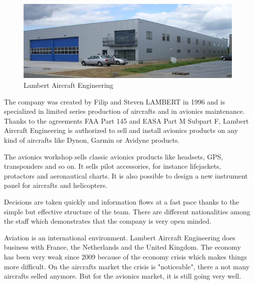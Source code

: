 \documentclass[11pt,a4paper]{article}
\begin{document}
\begin{figure}[ht!]
	\begin{center}
		\includegraphics[width=15cm]{pics/PIC001.jpg}
		\caption{Lambert Aircraft Engineering}
		\label{fig:PIC001}
	\end{center}
\end{figure}

The company was created by Filip and Steven LAMBERT in 1996 and is specialized in limited series production of aircrafts and in avionics maintenance. Thanks to the agreements FAA Part 145 and EASA Part M Subpart F, Lambert Aircraft Engineering is authorized to sell and install avionics products on any kind of aircrafts like Dynon, Garmin or Avidyne products.

\bigskip

The avionics workshop sells classic avionics products like headsets, GPS, transponders and so on. It sells pilot accessories, for instance lifejackets, protactors and aeronautical charts. It is also possible to design a new instrument panel for aircrafts and helicopters.

\bigskip

Decisions are taken quickly and information flows at a fast pace thanks to the simple but effective structure of the team.  There are different nationalities among the staff which demonstrates that the company is very open minded.

\bigskip

Aviation is an international environment. Lambert Aircraft Engineering does business with France, the Netherlands and the United Kingdom. The economy has been very weak since 2009 because of the economy crisis which makes things more difficult. On the aircrafts market the crisis is "noticeable", there a not many aircrafts selled anymore. But for the avionics market, it is still going very well.
\end{document}
